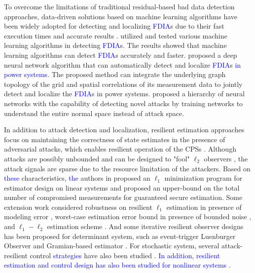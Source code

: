 To overcome the limitations of traditional residual-based bad data detection approaches, data-driven solutions based on machine learning algorithms have been widely adopted for detecting and localizing \textcolor{blue}{FDIA}s due to their fast execution times and accurate results \cite{ozay2016machine, boyaci2021joint, esmalifalak2011stealth, svm2, wilson2018deep, yan2016detection, lee2001training}. \cite{ozay2016machine} utilized and tested various machine learning algorithms in detecting \textcolor{blue}{FDIA}s. The results showed that machine learning algorithms can detect \textcolor{blue}{FDIA}s accurately and faster. \cite{boyaci2021joint} proposed a deep neural network algorithm that can automatically detect and localize \textcolor{blue}{FDIA}s \textcolor{blue}{in power systems.} The proposed method can integrate the underlying graph topology of the grid and spatial correlations of its measurement data to jointly detect and localize the \textcolor{blue}{FDIA}s in power systems. \cite{lee2001training} proposed a hierarchy of neural networks with the capability of detecting novel attacks by training networks to understand the entire normal space instead of attack space.

In addition to attack detection and localization, resilient estimation approaches focus on maintaining the correctness of state estimates in the presence of adversarial attacks, which enables resilient operation of the CPSs \cite{ding2020secure}. Although attacks are possibly unbounded and can be designed to "fool" $\ell_2$ observers \cite{mo2010false,liu2011false}, the attack signals are sparse due to the resource limitation of the attackers. Based on \textcolor{blue}{these} characteristics, \textcolor{blue}{the} authors in \cite{fawzi2014secure} proposed an $\ell_1$ minimization program for estimator design on linear systems and proposed an upper-bound on the total number of compromised measurements for guaranteed secure estimation. Some extension work considered robustness on resilient $\ell_1$ estimation in presence of modeling error \cite{pajic2014robustness}, worst-case estimation error bound in presence of bounded noise \cite{pajic2015attack}, and $\ell_1-\ell_2$ estimation scheme \cite{lee2015secure}. And some iterative resilient observer designs has been proposed for determinant system, such as event-trigger Luenburger Observer \cite{shoukry2015event} and Gramian-based estimator \cite{chong2015observability}. For stochastic system, several attack-resilient control \textcolor{blue}{strategies} have also been studied \cite{ding2016security, wan2019attack}. \textcolor{blue}{In addition, resilient estimation and control design has also been studied for nonlinear systems \cite{wang2018resilient}.  }

